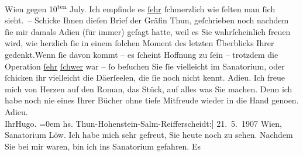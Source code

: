 \begin{ledgroupsized}[t]{13cm}
                  Wien gegen 10\textsuperscript{ten} July. Ich empfinde es \uline{ſehr}{ }ſchmerzlich wie ſelten man ſich sieht. –\pend
           \pstart
           {\pb}Schicke Ihnen dieſen Brief der
               Gräfin Thun, geſchrieben noch nachdem ſie mir
               damals Adieu (für immer) geſagt hatte, weil es Sie wahrſcheinlich freuen wird, wie
               herzlich ſie in einem ſolchen Moment des letzten Überblicks Ihrer gedenkt.\hspace*{1.5em}Wenn ſie davon kommt – es {\pb}ſcheint Hoffnung zu ſein –
               trotzdem die Operation \uline{ſehr}{ }\uline{ſchwer} war – ſo beſuchen Sie ſie vielleicht im Sanatorium, oder ſchicken ihr
               vielleicht die Dä{\geminationm}erſeelen, die ſie noch nicht kennt.\pend
           \pstart
           Adieu. Ich freue mich von Herzen auf den Roman, das Stück, auf alles was Sie machen. {\pb}Denn ich habe noch nie eines Ihrer
               Bücher ohne tiefe Mitfreude wieder in die Hand geno{\geminationm}en.\pend
           \pstart
           Adieu.{\\[\baselineskip]}Ihr\spacefill\mbox{Hugo.}\pend
           \leftskip=0em{}{\bigskip}\pstart
           \raggedleft{}{\pb}{[}hs. Thun-Hohenstein-Salm-Reifferscheidt:{]} 21. 5. 1907\pend
           \pstart
           \raggedleft{}Wien, Sanatorium Löw.\pend
           \pstart
           Ich habe mich sehr gefreut, Sie heute noch zu sehen. Nachdem Sie bei mir waren, bin
               ich ins Sanatorium gefahren. Es

\end{ledgroupsized}
